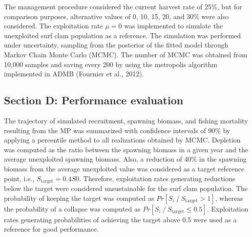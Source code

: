 \documentclass[]{article}
\begin{document}
The management procedure considered the current harvest rate of 25\%,
but for comparison purposes, alternative values of 0, 10, 15, 20, and
30\% were also considered. The exploitation rate \(\mu=0\) was
implemented to simulate the unexploited surf clam population as a
reference. The simulation was performed under uncertainty, sampling from
the posterior of the fitted model through Markov Chain Monte Carlo
(MCMC). The number of MCMC was obtained from 10,000 samples and saving
every 200 by using the metropolis algorithm implemented in ADMB
(Fournier et al., 2012).

\hypertarget{section-d-performance-evaluation}{%
\subsection{Section D: Performance
evaluation}\label{section-d-performance-evaluation}}

The trajectory of simulated recruitment, spawning biomass, and fishing
mortality resulting from the MP was summarized with confidence intervals
of 90\% by applying a percentile method to all realizations obtained by
MCMC. Depletion was computed as the ratio between the spawning biomass
in a given year and the average unexploited spawning biomass. Also, a
reduction of 40\% in the spawning biomass from the average unexploited
value was considered as a target reference point, i.e.,
\(S_{\text{target}} = 0.4S0\). Therefore, exploitation rates generating
reductions below the target were considered unsustainable for the surf
clam population. The probability of keeping the target was computed as
\(Pr[S_i⁄S_{\text{target}} >1]\), whereas the probability of a collapse
was computed as \(Pr[S_i⁄S_{\text{target}} \leq 0.5]\). Exploitation
rates generating probabilities of achieving the target above 0.5 were
used as a reference for good performance.
\end{document}
